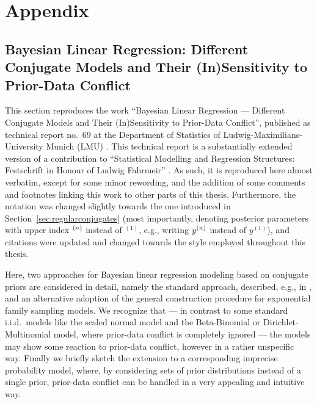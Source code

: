 \chapter{Appendix}
\label{cha:appendix}


\section{Bayesian Linear Regression: Different Conjugate Models and Their (In)Sensi\-ti\-vi\-ty to Prior-Data Conflict}
\label{sec:festschrift}

This section reproduces the work
``Bayesian Linear Regression --- Different Conjugate Models and Their (In)Sensitivity to Prior-Data Conflict'',
published as technical report no.~69 at the Department of Statistics of Ludwig-Maximilians-University Munich (LMU)
\parencite{Walter2009b}. This technical report is a substantially extended version of a contribution to
``Statistical Modelling and Regression Structures: Festschrift in Honour of Ludwig Fahrmeir'' \parencite{Walter2010a}.
As such, it is reproduced here almost verbatim, except for some minor rewording,
and the addition of some comments and footnotes linking this work to other parts of this thesis.
Furthermore, the notation was changed slightly towards the one introduced in Section~\ref{sec:regularconjugates}
(most importantly, denoting posterior parameters with upper index ${}^{(n)}$ instead of ${}^{(1)}$,
e.g., writing $y^{(n)}$ instead of $y^{(1)}$),
and citations were updated and changed towards the style employed throughout this thesis.

Here, two approaches for
Bayesian linear regression modeling based on conjugate priors are
considered in detail, namely the standard approach, described, e.g., in
\textcite{2013:fahrmeier-kneib-lang-marx}, and an alternative adoption of the
general construction procedure for exponential family sampling
models. We recognize that --- in contrast to some standard i.i.d.\
models like the scaled normal model and the Beta-Binomial or
Dirichlet-Multinomial model, where prior-data conflict is completely
ignored --- the models may show some reaction to prior-data conflict,
however in a rather unspecific way. Finally we briefly sketch the
extension to a corresponding imprecise probability model, where,
by considering sets of prior distributions instead of a single prior,
prior-data conflict can be handled in a very appealing and intuitive way.


